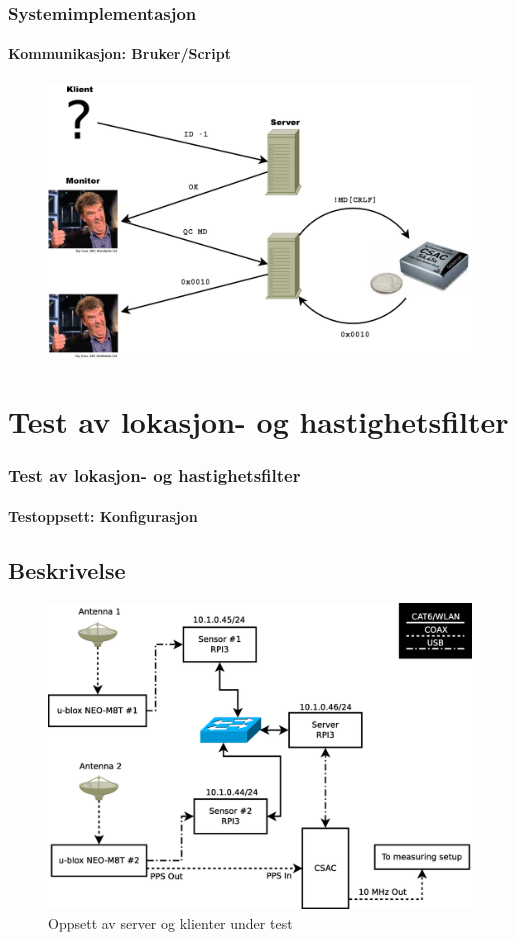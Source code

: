 \documentclass[xcolor=table]{beamer}
\begin{document}
\begin{frame}
\frametitle{Systemimplementasjon}
  \framesubtitle{Kommunikasjon: Bruker/Script}
    \begin{figure}
      \includegraphics[scale=0.3]{thesis/graphics/monitor_csac_request.pdf}
    \end{figure}
\end{frame}

\section{Test av lokasjon- og hastighetsfilter}
\begin{frame}
\frametitle{Test av lokasjon- og hastighetsfilter}
\framesubtitle{Testoppsett: Konfigurasjon}
  \subsection{Beskrivelse}
      \begin{figure}
        \includegraphics[scale=0.25]{thesis/graphics/server_layout.eps}
        \caption{Oppsett av server og klienter under test}
      \end{figure}
\end{frame}
\end{document}
